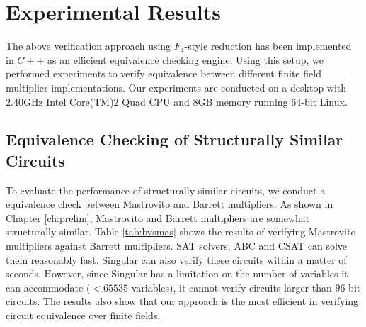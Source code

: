 \section{Experimental Results}
The above verification approach using $F_4$-style reduction 
has been implemented in $C++$ as an efficient equivalence checking
engine. Using this setup, we performed experiments to verify
equivalence between different finite field multiplier
implementations. Our experiments are conducted on a desktop with
$2.40$GHz Intel Core(TM)$2$ Quad CPU and  $8$GB memory running
$64$-bit Linux.  

\subsection{Equivalence Checking of Structurally Similar Circuits}
To evaluate the performance of structurally similar circuits, we
conduct a equivalence check between Mastrovito and Barrett
multipliers. As shown in Chapter \ref{ch:prelim}, Mastrovito and
Barrett multipliers are somewhat structurally similar. 
Table \ref{tab:bvsmas} shows the results of verifying Mastrovito
multipliers against Barrett multipliers. SAT solvers, ABC and CSAT can 
solve them reasonably fast. Singular can also verify these circuits
within a matter of seconds. However, since Singular has a limitation
on the number of variables it can accommodate ($< 65535$ variables),
it cannot verify circuits larger than $96$-bit circuits.
The results also show that our approach is the most efficient in
verifying circuit equivalence over finite fields.



